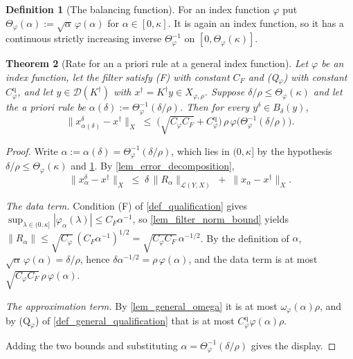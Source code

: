 \documentclass[a4paper]{report}
\theoremstyle{plain}
\newtheorem{theorem}{Theorem}[chapter]
\theoremstyle{definition}
\newtheorem{definition}[theorem]{Definition}
\theoremstyle{remark}
\newcommand{\Ll}{\mathcal{L}}
\newcommand{\Dom}{\mathcal{D}}
\newcommand{\dg}{^{\dagger}}
\begin{document}
\begin{definition}[The balancing function]
  \label{def_theta_function}
  For an index function $\varphi$ put
  $\Theta_{\varphi}(\alpha) := \sqrt{\alpha}\,\varphi(\alpha)$ for
  $\alpha \in [0,\kappa]$.  It is again an index function, so it has a continuous strictly
  increasing inverse $\Theta_{\varphi}^{-1}$ on $[0,\Theta_{\varphi}(\kappa)]$.
\end{definition}


\begin{theorem}[Rate for an a priori rule at a general index function]
  \label{thm_general_apriori_rate}
  Let $\varphi$ be an index function, let the filter satisfy (F) with constant $C_F$ and
  (Q$_{\varphi}$) with constant $C^{\mathrm{q}}_{\varphi}$, and let $y \in \Dom(K\dg)$
  with $x\dg = K\dg y \in X_{\varphi,\rho}$.  Suppose $\delta/\rho \le
  \Theta_{\varphi}(\kappa)$ and let the a priori rule be
  $\alpha(\delta) := \Theta_{\varphi}^{-1}(\delta/\rho)$.  Then for every
  $y^{\delta} \in B_{\delta}(y)$,
  \[
    \|x^{\delta}_{\alpha(\delta)} - x\dg\|_X \;\le\;
      \bigl(\sqrt{C_{\varphi}C_F} + C^{\mathrm{q}}_{\varphi}\bigr)\,
      \rho\,\varphi\bigl(\Theta_{\varphi}^{-1}(\delta/\rho)\bigr) .
  \]
\end{theorem}
\begin{proof}
  Write $\alpha := \alpha(\delta) = \Theta_{\varphi}^{-1}(\delta/\rho)$, which lies in
  $(0,\kappa]$ by the hypothesis $\delta/\rho \le \Theta_{\varphi}(\kappa)$ and
  \cref{def_theta_function}.  By \cref{lem_error_decomposition},
  \[
    \|x^{\delta}_{\alpha} - x\dg\|_X \;\le\;
      \delta\,\|R_{\alpha}\|_{\Ll(Y,X)} \;+\; \|x_{\alpha}-x\dg\|_X .
  \]

  \emph{The data term.}  Condition (F) of \cref{def_qualification} gives
  $\sup_{\lambda \in (0,\kappa]}|\varphi_{\alpha}(\lambda)| \le C_F\alpha^{-1}$, so
  \cref{lem_filter_norm_bound} yields
  $\|R_{\alpha}\| \le \sqrt{C_{\varphi}}\,(C_F\alpha^{-1})^{1/2}
  = \sqrt{C_{\varphi}C_F}\,\alpha^{-1/2}$.  By the definition of $\alpha$,
  $\sqrt{\alpha}\,\varphi(\alpha) = \delta/\rho$, hence
  $\delta\alpha^{-1/2} = \rho\,\varphi(\alpha)$, and the data term is at most
  $\sqrt{C_{\varphi}C_F}\,\rho\,\varphi(\alpha)$.

  \emph{The approximation term.}  By \cref{lem_general_omega} it is at most
  $\omega_{\varphi}(\alpha)\rho$, and by (Q$_{\varphi}$) of
  \cref{def_general_qualification} that is at most
  $C^{\mathrm{q}}_{\varphi}\varphi(\alpha)\rho$.

  Adding the two bounds and substituting
  $\alpha = \Theta_{\varphi}^{-1}(\delta/\rho)$ gives the display.
\end{proof}
\end{document}
